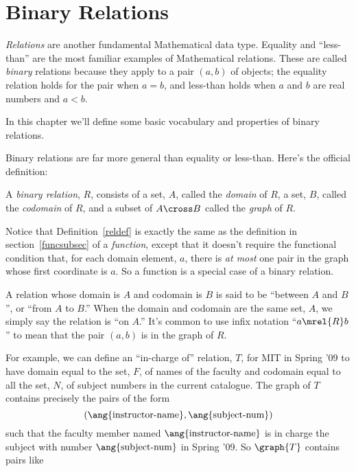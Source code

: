 \chapter{Binary Relations}

\emph{Relations} are another fundamental Mathematical data type.  Equality
and ``less-than'' are the most familiar examples of Mathematical relations.
These are called \emph{binary} relations because they apply to a pair
$(a,b)$ of objects; the equality relation holds for the pair when $a=b$,
and less-than holds when $a$ and $b$ are real numbers and $a < b$.

In this chapter we'll define some basic vocabulary and properties of binary
relations.

Binary relations are far more general than equality or less-than.
Here's the official definition:
\begin{definition}\label{reldef}
A \emph{binary relation}, $R$, consists of a set, $A$, called
the \emph{domain} of $R$, a set, $B$, called the \emph{codomain} of $R$, and
a subset of $A \cross B$ called the \emph{graph} of $R$.
\end{definition}

Notice that Definition~\ref{reldef} is exactly the same as the definition
in section~\ref{funcsubsec} of a {\emph{function}}, except that it doesn't
require the functional condition that, for each domain element, $a$, there
is \emph{at most} one pair in the graph whose first coordinate is $a$.  So
a function is a special case of a binary relation.

A relation whose domain is $A$ and codomain is $B$ is said to be
``between $A$ and $B$'', or ``from $A$ to $B$.''  When the domain and
codomain are the same set, $A$, we simply say the relation is ``on $A$.''
It's common to use infix notation ``$a \mrel{R} b$'' to mean that the pair
$(a,b)$ is in the graph of $R$.

For example, we can define an ``in-charge of'' relation, $T$, for MIT in
Spring '09 to have domain equal to the set, $F$, of names of the faculty
and codomain equal to all the set, $N$, of subject numbers in the current
catalogue.  The graph of $T$ contains precisely the pairs of the form
\[
(\ang{\text{instructor-name}}, \ang{\text{subject-num}})
\]
such that the faculty member named $\ang{\text{instructor-name}}$ is
in charge the subject with number $\ang{\text{subject-num}}$ in Spring '09.
So $\graph{T}$ contains pairs like

